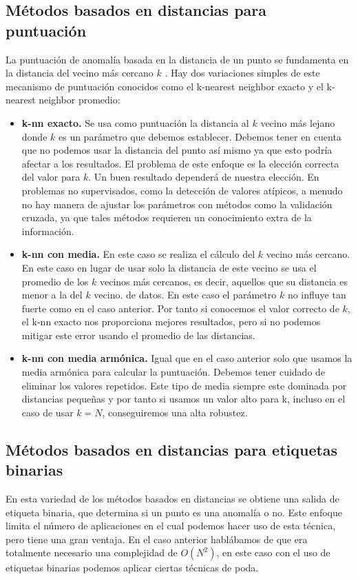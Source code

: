 \subsection{Métodos basados en distancias para puntuación}
La puntuación de anomalía basada en la distancia de un punto
se fundamenta en la distancia del vecino más cercano $k$ . 
Hay dos variaciones simples de este mecanismo de puntuación conocidos como
el k-nearest neighbor exacto y el k-nearest neighbor promedio:




\begin{itemize}
    \item \textbf{k-nn exacto.} Se usa como puntuación la distancia al
    $k$ vecino más lejano donde $k$ es un parámetro que debemos establecer.
    Debemos tener en cuenta que no podemos usar la distancia del punto
    así mismo ya que esto podría afectar a los resultados. El problema
    de este enfoque es la elección correcta del valor para $k$. Un buen
    resultado dependerá de nuestra elección. En problemas no supervisados,
    como la detección de valores atípicos, a menudo no hay manera de 
    ajustar los parámetros con métodos como la validación cruzada,
    ya que tales métodos requieren un conocimiento extra de la información.
    \item \textbf{k-nn con media.} En este caso se realiza el cálculo del
    $k$ vecino más cercano. En este caso en lugar de usar solo la distancia
    de este vecino se usa el promedio de los $k$ vecinos más cercanos, es decir,
    aquellos que su distancia es menor a la del $k$ vecino.
    de datos. En este caso el parámetro $k$ no influye tan fuerte como en el caso
    anterior. Por tanto si conocemos el valor correcto de $k$, el k-nn exacto
    nos proporciona mejores resultados, pero si no podemos mitigar este error
    usando el promedio de las distancias.
    \item \textbf{k-nn con media armónica.} Igual que en el caso anterior
    solo que usamos la media armónica para calcular la puntuación. Debemos
    tener cuidado de eliminar los valores repetidos. Este tipo de media siempre
    este dominada por distancias pequeñas y por tanto si usamos un valor alto
    para k, incluso en el caso de usar $ k = N$, conseguiremos una alta robustez.
    
\end{itemize}

\subsection{Métodos basados en distancias para etiquetas binarias}
En esta variedad de los métodos basados en distancias se obtiene una salida
de etiqueta binaria, que determina si un punto es una anomalía o no. Este
enfoque limita el número de aplicaciones en el cual podemos hacer uso de 
esta técnica, pero tiene una gran ventaja. En el caso anterior hablábamos de 
que era totalmente necesario una complejidad de $O(N^2)$, en este caso con
el uso de etiquetas binarias podemos aplicar ciertas técnicas de poda.


